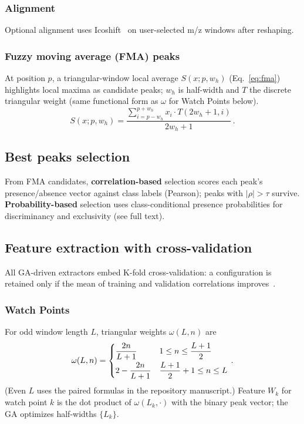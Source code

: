 \documentclass[preprint,12pt]{elsarticle}
\begin{document}
\subsubsection{Alignment}
Optional alignment uses Icoshift~\cite{Tomasi2011} on user-selected m/z windows after reshaping.

\subsubsection{Fuzzy moving average (FMA) peaks}
At position $p$, a triangular-window local average $S(x;p,w_h)$ (Eq.~\ref{eq:fma}) highlights local maxima as candidate peaks; $w_h$ is half-width and $T$ the discrete triangular weight (same functional form as $\omega$ for Watch Points below).
\begin{equation}
S(x; p, w_h) = \frac{\sum_{i=p-w_h}^{p+w_h} x_i \cdot T(2w_h+1, i)}{2w_h+1}\,.
\label{eq:fma}
\end{equation}

\subsection{Best peaks selection}
From FMA candidates, \textbf{correlation-based} selection scores each peak's presence/absence vector against class labels (Pearson); peaks with $|\rho|>\tau$ survive. \textbf{Probability-based} selection uses class-conditional presence probabilities for discriminancy and exclusivity (see full text).

\subsection{Feature extraction with cross-validation}
All GA-driven extractors embed K-fold cross-validation: a configuration is retained only if the mean of training and validation correlations improves~\cite{Liu2013}.

\subsubsection{Watch Points}
For odd window length $L$, triangular weights $\omega(L,n)$ are
\begin{equation}
\omega(L,n) = \begin{cases} \dfrac{2n}{L+1} & 1 \leq n \leq \dfrac{L+1}{2} \\[\medskipamount]
2 - \dfrac{2n}{L+1} & \dfrac{L+1}{2}+1 \leq n \leq L \end{cases}\,.
\end{equation}
(Even $L$ uses the paired formulas in the repository manuscript.) Feature $W_k$ for watch point $k$ is the dot product of $\omega(L_k,\cdot)$ with the binary peak vector; the GA optimizes half-widths $\{L_k\}$.
\end{document}
